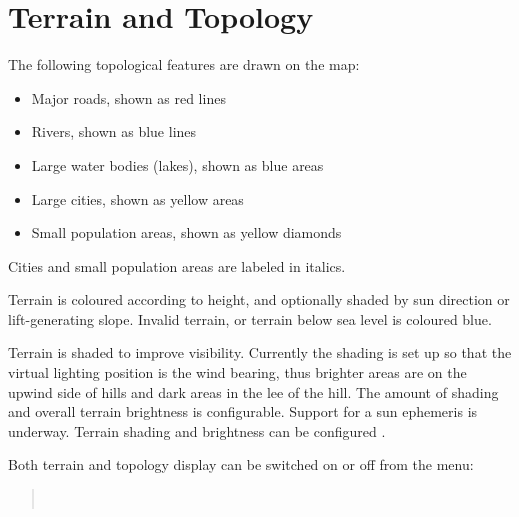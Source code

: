 \section{Terrain and Topology}

The following topological features are drawn on the map:
\begin{itemize}
\item Major roads, shown as red lines
\item Rivers, shown as blue lines
\item Large water bodies (lakes), shown as blue areas
\item Large cities, shown as yellow areas
\item Small population areas, shown as yellow diamonds
\end{itemize}
Cities and small population areas are labeled in italics.

Terrain is coloured according to height, and optionally shaded by sun
direction or lift-generating slope.  Invalid terrain, or terrain below
sea level is coloured blue.

Terrain is shaded to improve visibility.  Currently the shading
is set up so that the virtual lighting position is the wind bearing,
thus brighter areas are on the upwind side of hills and dark areas in
the lee of the hill.  The amount of shading and overall terrain
brightness is configurable.  Support for a sun ephemeris is underway.
Terrain shading and brightness can be configured .

Both terrain and topology display can be switched on or off from the
menu:
\begin{quote}
\blink{}\blink{} \\
\blink{}\blink{}
\end{quote}


